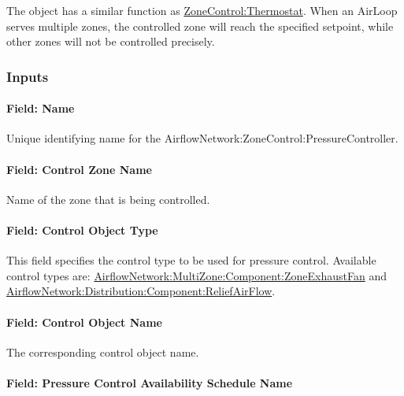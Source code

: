 The object has a similar function as \hyperref[zonecontrolthermostat]{ZoneControl:Thermostat}. When an AirLoop serves multiple zones, the controlled zone will reach the specified setpoint, while other zones will not be controlled precisely.

\subsubsection{Inputs}\label{inputs-AFN-pressure-control}

\paragraph{Field: Name}\label{field-name-AFN-pressure-control}

Unique identifying name for the AirflowNetwork:ZoneControl:PressureController.

\paragraph{ Field: Control Zone Name}\label{field-control-zone-name}

Name of the zone that is being controlled.

\paragraph{ Field: Control Object Type}\label{field-control-object-type}

This field specifies the control type to be used for pressure control. Available control types are:
\hyperref[airflownetworkmultizonecomponentzoneexhaustfan]{AirflowNetwork:MultiZone:Component:ZoneExhaustFan} and \hyperref[airflowNetworkdistributioncomponentreliefairflow]{AirflowNetwork:Distribution:Component:ReliefAirFlow}.

\paragraph{ Field: Control Object Name}\label{field-control-name}

The corresponding control object name.

\paragraph{ Field: Pressure Control Availability Schedule Name}\label{field-pressure-control-availability-schedule-name}

